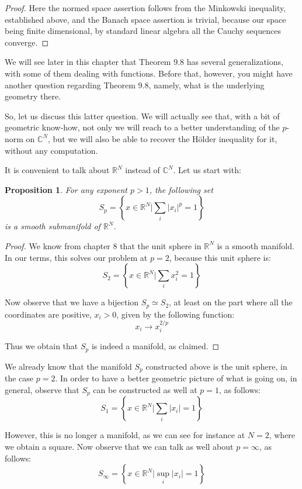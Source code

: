 \documentclass[12pt]{amsbook}
\newtheorem{proposition}[theorem]{Proposition}
\begin{document}
\begin{proof}
Here the normed space assertion follows from the Minkowski inequality, established above, and the Banach space assertion is trivial, because our space being finite dimensional, by standard linear algebra all the Cauchy sequences converge.
\end{proof}

We will see later in this chapter that Theorem 9.8 has several generalizations, with some of them dealing with functions. Before that, however, you might have another question regarding Theorem 9.8, namely, what is the underlying geometry there.

\bigskip

So, let us discuss this latter question. We will actually see that, with a bit of geometric know-how, not only we will reach to a better understanding of the $p$-norm on $\mathbb C^N$, but we will also be able to recover the H\"older inequality for it, without any computation. 

\bigskip

It is convenient to talk about $\mathbb R^N$ instead of $\mathbb C^N$. Let us start with:

\begin{proposition}
For any exponent $p>1$, the following set
$$S_p=\left\{x\in\mathbb R^N\Big|\sum_i|x_i|^p=1\right\}$$
is a smooth submanifold of $\mathbb R^N$.
\end{proposition}

\begin{proof}
We know from chapter 8 that the unit sphere in $\mathbb R^N$ is a smooth manifold. In our terms, this solves our problem at $p=2$, because this unit sphere is:
$$S_2=\left\{x\in\mathbb R^N\Big|\sum_ix_i^2=1\right\}$$

Now observe that we have a bijection $S_p\simeq S_2$, at least on the part where all the coordinates are positive, $x_i>0$, given by the following function:
$$x_i\to x_i^{2/p}$$

Thus we obtain that $S_p$ is indeed a manifold, as claimed.
\end{proof}

We already know that the manifold $S_p$ constructed above is the unit sphere, in the case $p=2$. In order to have a better geometric picture of what is going on, in general, observe that $S_p$ can be constructed as well at $p=1$, as follows:
$$S_1=\left\{x\in\mathbb R^N\Big|\sum_i|x_i|=1\right\}$$

However, this is no longer a manifold, as we can see for instance at $N=2$, where we obtain a square. Now observe that we can talk as well about $p=\infty$, as follows:
$$S_\infty=\left\{x\in\mathbb R^N\Big|\sup_i|x_i|=1\right\}$$
\end{document}

